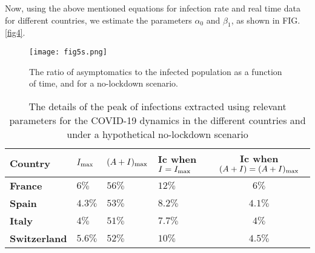 \documentclass[aps,floatfix,prl,superscriptaddress]{revtex4}
\begin{document}
Now, using the above mentioned equations for infection rate and real time data for different countries, we estimate the parameters $\alpha_0$ and $\beta_1$, as shown in FIG.\ref{fig4}.
\begin{figure}
	\texttt{[image: fig5s.png]}
	\caption{\label{fig5} The ratio of asymptomatics to the infected population as a function of time, and for a no-lockdown scenario. }
\end{figure}
\begin{table} 
	\caption{\label{table2} The details of the peak of infections extracted using relevant parameters for the COVID-19 dynamics in the different countries and under a hypothetical no-lockdown scenario}
	\begin{ruledtabular}
		\begin{tabular}{|l|l|l|l|c|}
			Country &  $I_{\rm max}$ & $(A+I)_{\rm max}$ & Ic when $I=I_{\rm max}$ & Ic when $(A+I)=(A+I)_{\rm max}$
			\\ \hline
			\textbf{France}    &  $6 \%$   & $56 \%$ & $12 \%$   &  $6 \%$       
			\\ 
			\textbf{Spain}     & $4.3 \%$     & $53 \%$   & $8.2 \%$  & $4.1 \%$
			\\
			\textbf{Italy} & $4 \%$  &   $51 \%$  &  $7.7 \%$    & $4 \%$  
			\\  
			\textbf{Switzerland} & $5.6 \%$   &    $52 \%$  &  $10 \%$    &  $4.5 \%$  
			\\ 
		\end{tabular}
	\end{ruledtabular}
\end{table}
\end{document}
